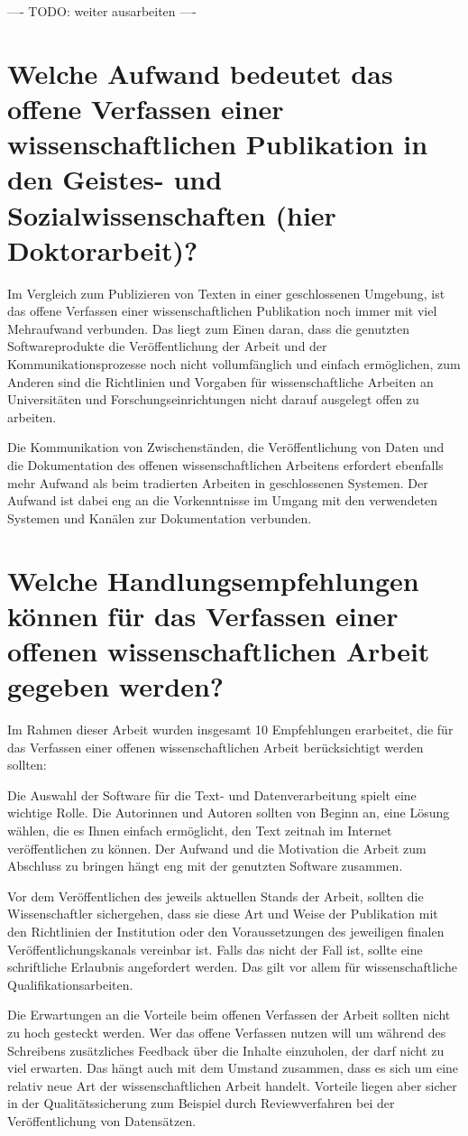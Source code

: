 ---- TODO: weiter ausarbeiten ----

\section{Welche Aufwand bedeutet das offene Verfassen einer wissenschaftlichen Publikation in den Geistes- und Sozialwissenschaften (hier Doktorarbeit)?}

Im Vergleich zum Publizieren von Texten in einer geschlossenen Umgebung, ist das offene Verfassen einer wissenschaftlichen Publikation noch immer mit viel Mehraufwand verbunden. Das liegt zum Einen daran, dass die genutzten Softwareprodukte die Veröffentlichung der Arbeit und der Kommunikationsprozesse noch nicht vollumfänglich und einfach ermöglichen, zum Anderen sind die Richtlinien und Vorgaben für wissenschaftliche Arbeiten an Universitäten und Forschungseinrichtungen nicht darauf ausgelegt offen zu arbeiten.

Die Kommunikation von Zwischenständen, die Veröffentlichung von Daten und die Dokumentation des offenen wissenschaftlichen Arbeitens erfordert ebenfalls mehr Aufwand als beim tradierten Arbeiten in geschlossenen Systemen. Der Aufwand ist dabei eng an die Vorkenntnisse im Umgang mit den verwendeten Systemen und Kanälen zur Dokumentation verbunden.

\section{Welche Handlungsempfehlungen können für das Verfassen einer offenen wissenschaftlichen Arbeit gegeben werden?}

Im Rahmen dieser Arbeit wurden insgesamt 10 Empfehlungen erarbeitet, die für das Verfassen einer offenen wissenschaftlichen Arbeit berücksichtigt werden sollten:

Die Auswahl der Software für die Text- und Datenverarbeitung spielt eine wichtige Rolle. Die Autorinnen und Autoren sollten von Beginn an, eine Lösung wählen, die es Ihnen einfach ermöglicht, den Text zeitnah im Internet veröffentlichen zu können. Der Aufwand und die Motivation die Arbeit zum Abschluss zu bringen hängt eng mit der genutzten Software zusammen.

Vor dem Veröffentlichen des jeweils aktuellen Stands der Arbeit, sollten die Wissenschaftler sichergehen, dass sie diese Art und Weise der Publikation mit den Richtlinien der Institution oder den Voraussetzungen des jeweiligen finalen Veröffentlichungskanals vereinbar ist. Falls das nicht der Fall ist, sollte eine schriftliche Erlaubnis angefordert werden. Das gilt vor allem für wissenschaftliche Qualifikationsarbeiten.

Die Erwartungen an die Vorteile beim offenen Verfassen der Arbeit sollten nicht zu hoch gesteckt werden. Wer das offene Verfassen nutzen will um während des Schreibens zusätzliches Feedback über die Inhalte einzuholen, der darf nicht zu viel erwarten. Das hängt auch mit dem Umstand zusammen, dass es sich um eine relativ neue Art der wissenschaftlichen Arbeit handelt. Vorteile liegen aber sicher in der Qualitätssicherung zum Beispiel durch Reviewverfahren bei der Veröffentlichung von Datensätzen.
